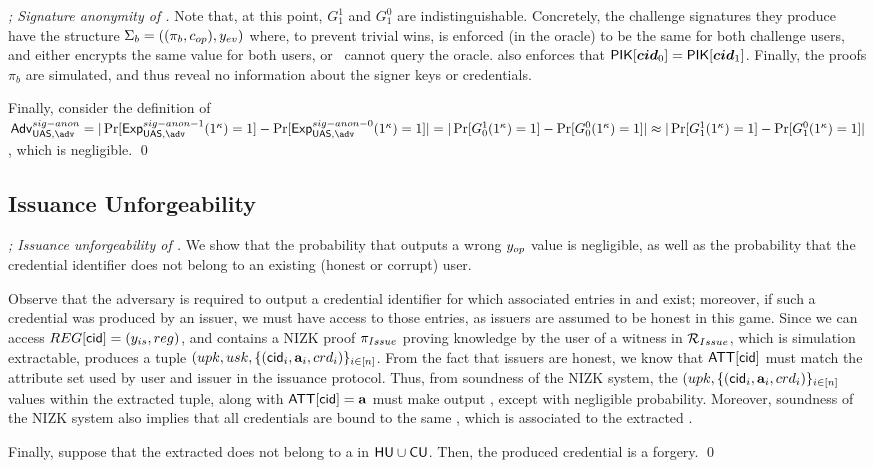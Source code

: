 \begin{proof}[; Signature anonymity of \CUASGen]
  Note that, at this point, $G_1^1$ and $G_1^0$ are indistinguishable.
  Concretely, the challenge signatures they produce have the structure $\Sigma_b =
  ((\pi_b,c_{op}),y_{ev})$ where, to prevent trivial wins, \yeval is enforced
  (in the \SIGN oracle) to be the same for both challenge users, and \cinsp
  either encrypts the same value for both users, or \adv~cannot query the \OPEN
  oracle. \SIGN also enforces that $\mathsf{P}\mathsf{IK}[\boldsymbol{cid}_0] = \mathsf{P}\mathsf{IK}[\boldsymbol{cid}_1]$. Finally,
  the proofs $\pi_b$ are simulated, and thus reveal no information about the
  signer keys or credentials.

  Finally, consider the definition of $\AdvSigAnon=|\Pr\lbrack
  \ExpSigAnono(1^\secpar)=1\rbrack-\Pr\lbrack\ExpSigAnonz(1^\secpar)=1\rbrack|
  = |\Pr\lbrack G_0^1(1^\secpar)=1\rbrack-\Pr\lbrack
  G_0^0(1^\secpar)=1\rbrack| \approx
  |\Pr\lbrack G_1^1(1^\secpar)=1\rbrack-\Pr\lbrack
  G_1^0(1^\secpar)=1\rbrack|$, which is negligible.
  \qed
\end{proof}

\subsection{Issuance Unforgeability}

\begin{proof}[; Issuance unforgeability of \CUASGen]
  We show that the probability that \fissue outputs a wrong $y_{op}$ value is
  negligible, as well as the probability that the credential identifier does not
  belong to an existing (honest or corrupt) user.

  Observe that the adversary is required to output a credential identifier for
  which associated entries in \trans and \CRED exist; moreover, if such a
  credential was produced by an issuer, we must have access to those entries, as
  issuers are assumed to be honest in this game.
  Since we can access $\trans[\cid] = (\yissue,\utrans)$, and \utrans contains
  a NIZK proof $\pi_{Issue}$ proving knowledge by the user of a witness
  in $\mathcal{R}_{Issue}$, which is simulation extractable, \ExtractIssue
  produces a tuple $(upk,usk,\lbrace (\mathsf{cid}_i,\mathbf{a}_i,crd_i)
  \rbrace_{i\in[n]}$.
  From the fact that issuers are honest, we know that $\mathsf{ATT}[\mathsf{cid}]$ must match
  the attribute set \attrs used by user and issuer in the issuance protocol.
  Thus, from  soundness of the NIZK system, the $(upk,\lbrace (\mathsf{cid}_i,\mathbf{a}_i,
  crd_i) \rbrace_{i\in[n]}$ values within the extracted tuple, along with
  $\mathsf{ATT}[\mathsf{cid}] = \mathbf{a}$ must make \fissue output \yissue, except with
  negligible probability. Moreover, soundness of the NIZK system also implies
  that all credentials are bound to the same \usk, which is associated to the
  extracted \upk.
  
  Finally, suppose that the extracted \upk does not belong to a \uid in
  $\mathsf{HU} \cup \mathsf{CU}$. Then, the produced credential is a forgery. 
  \qed
\end{proof}

